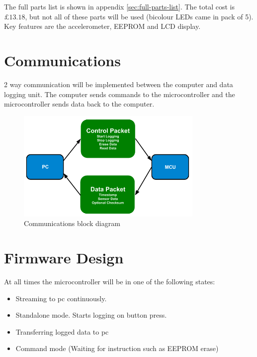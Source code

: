 \documentclass[a4paper,11pt]{article}  %
\begin{document}
The full parts list is shown in appendix
\ref{sec:full-parts-list}. The total cost is $\pounds 13.18$, but not
all of these parts will be used (bicolour LEDs came in pack of 5). Key
features are the accelerometer, EEPROM and LCD display.

\section{Communications}
\label{sec:communications}

2 way communication will be implemented between the computer and data
logging unit. The computer sends commands to the microcontroller and
the microcontroller sends data back to the computer.

\begin{figure}[!h]
  \begin{center}
    \includegraphics[width=0.8\textwidth]{comms_diagram.png}
  \end{center}
  \caption{Communications block diagram}
  \label{fig:commsdiag}
\end{figure}

\section{Firmware Design}
\label{sec:firmware-design}

At all times the microcontroller will be in one of the following
states:

\begin{itemize}
  \item Streaming to pc continuously.
  \item Standalone mode. Starts logging on button press.
  \item Transferring logged data to pc
  \item Command mode (Waiting for instruction such as EEPROM erase)
\end{itemize}
\end{document}
